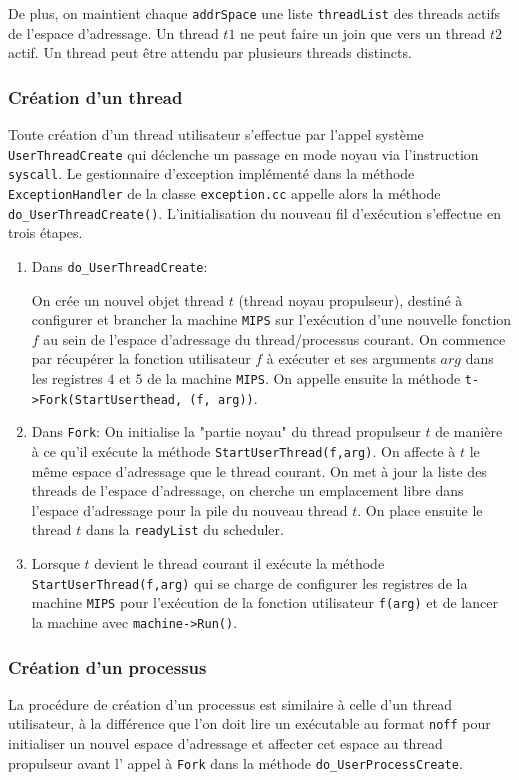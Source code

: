 \documentclass[11pt]{article}
\theoremstyle{definition}
\theoremstyle{definition}
\begin{document}
De plus, on maintient chaque \texttt{addrSpace} une liste \texttt{threadList} des threads actifs de l'espace d'adressage.
Un thread $t1$ ne peut faire un join que vers un thread $t2$ actif.
Un thread peut être attendu par plusieurs threads distincts.

\subsubsection{Création d'un thread}
Toute création d'un thread utilisateur s'effectue par l'appel système
\texttt{UserThreadCreate}
qui déclenche un passage en mode noyau via l'instruction \texttt{syscall}.
Le gestionnaire d'exception implémenté dans la méthode \texttt{ExceptionHandler} de la classe
\texttt{exception.cc} appelle alors la méthode \texttt{do\_UserThreadCreate()}.
L'initialisation du nouveau fil d'exécution s'effectue en trois étapes.

\begin{enumerate}
\item Dans \texttt{do\_UserThreadCreate}:

On crée un nouvel objet thread $t$ (thread noyau propulseur), destiné à configurer et brancher la machine \texttt{MIPS} sur l'exécution d'une nouvelle fonction $f$ au sein de l'espace d'adressage du thread/processus courant.
On commence par récupérer la fonction utilisateur $f$ à exécuter et ses arguments $arg$ dans les registres $4$ et $5$ de la machine \texttt{MIPS}. On appelle ensuite la méthode \texttt{t->Fork(StartUserthead, (f, arg))}.

\item Dans \texttt{Fork}:
On initialise la "partie noyau" du thread propulseur $t$ de manière
à ce qu'il exécute la méthode \texttt{StartUserThread(f,arg)}. On affecte à $t$ le même espace d'adressage que le thread courant. On met à jour la liste des threads de l'espace d'adressage, on cherche un emplacement
libre dans l'espace d'adressage pour la pile du nouveau thread $t$.
On place ensuite le thread $t$ dans la \texttt{readyList} du scheduler.

\item Lorsque $t$ devient le thread courant il exécute la méthode \texttt{StartUserThread(f,arg)}
qui se charge de configurer les registres de la machine \texttt{MIPS} pour l'exécution
de la fonction utilisateur \texttt{f(arg)} et de lancer la machine avec \texttt{machine->Run()}. 
\end{enumerate}

\subsubsection{Création d'un processus}
La procédure de création d'un processus est similaire à celle d'un thread utilisateur, à la différence que l'on doit lire un exécutable au format \texttt{noff} pour initialiser un nouvel espace d'adressage et affecter cet espace au thread propulseur avant l' appel à \texttt{Fork} dans la méthode \texttt{do\_UserProcessCreate}.
\end{document}
